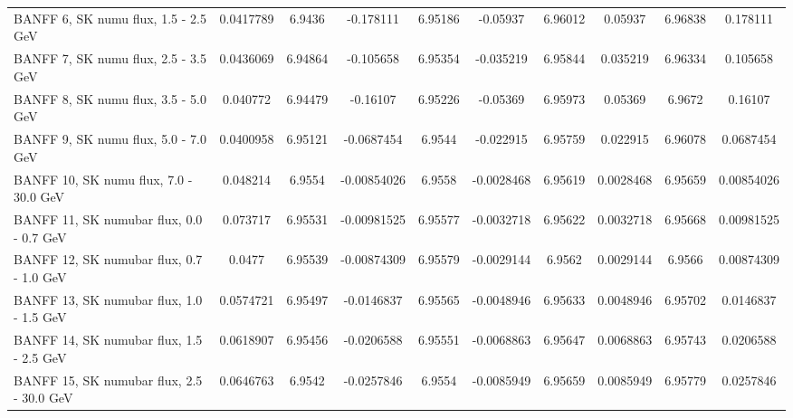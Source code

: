 \begin{tabular}{| l | S | S  S | S  S | S  S | S  S | }
                                           BANFF  6, SK numu flux, 1.5 - 2.5 GeV &       0.0417789 &          6.9436 &       -0.178111 &         6.95186 &        -0.05937 &         6.96012 &         0.05937 &         6.96838 &        0.178111 \\ 
                                           BANFF  7, SK numu flux, 2.5 - 3.5 GeV &       0.0436069 &         6.94864 &       -0.105658 &         6.95354 &       -0.035219 &         6.95844 &        0.035219 &         6.96334 &        0.105658 \\ 
                                           BANFF  8, SK numu flux, 3.5 - 5.0 GeV &        0.040772 &         6.94479 &        -0.16107 &         6.95226 &        -0.05369 &         6.95973 &         0.05369 &          6.9672 &         0.16107 \\ 
                                           BANFF  9, SK numu flux, 5.0 - 7.0 GeV &       0.0400958 &         6.95121 &      -0.0687454 &          6.9544 &       -0.022915 &         6.95759 &        0.022915 &         6.96078 &       0.0687454 \\ 
                                          BANFF 10, SK numu flux, 7.0 - 30.0 GeV &        0.048214 &          6.9554 &     -0.00854026 &          6.9558 &      -0.0028468 &         6.95619 &       0.0028468 &         6.95659 &      0.00854026 \\ 
                                        BANFF 11, SK numubar flux, 0.0 - 0.7 GeV &        0.073717 &         6.95531 &     -0.00981525 &         6.95577 &      -0.0032718 &         6.95622 &       0.0032718 &         6.95668 &      0.00981525 \\ 
                                        BANFF 12, SK numubar flux, 0.7 - 1.0 GeV &          0.0477 &         6.95539 &     -0.00874309 &         6.95579 &      -0.0029144 &          6.9562 &       0.0029144 &          6.9566 &      0.00874309 \\ 
                                        BANFF 13, SK numubar flux, 1.0 - 1.5 GeV &       0.0574721 &         6.95497 &      -0.0146837 &         6.95565 &      -0.0048946 &         6.95633 &       0.0048946 &         6.95702 &       0.0146837 \\ 
                                        BANFF 14, SK numubar flux, 1.5 - 2.5 GeV &       0.0618907 &         6.95456 &      -0.0206588 &         6.95551 &      -0.0068863 &         6.95647 &       0.0068863 &         6.95743 &       0.0206588 \\ 
                                       BANFF 15, SK numubar flux, 2.5 - 30.0 GeV &       0.0646763 &          6.9542 &      -0.0257846 &          6.9554 &      -0.0085949 &         6.95659 &       0.0085949 &         6.95779 &       0.0257846 \\ 

\end{tabular}
